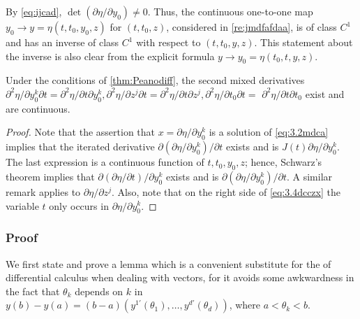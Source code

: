 \documentclass{article}
\begin{document}
\begin{rema}\label{re:sdafa}
By \cref{eq:ijcad},  $\det \left(\partial \eta / \partial y_{0}\right) \neq 0$. Thus, the continuous one-to-one map $y_{0} \rightarrow y=\eta\left(t, t_{0}, y_{0}, z\right)$ for  $\left(t, t_{0}, z\right)$, considered in \cref{re:jmdfafdaa}, is of class $C^{1}$ and has an inverse of class $C^{1}$ with respect to $\left(t, t_{0}, y, z\right)$. This statement about the inverse is also clear from the explicit formula $y \rightarrow y_{0}=\eta\left(t_{0}, t, y, z\right)$.
\end{rema} 

 

\begin{cora}\label{cor:dafe}
 Under the conditions of \cref{thm:Peanodiff}, the second mixed derivatives $\partial^{2} \eta / \partial y_{0}^{k} \partial t=\partial^{2} \eta / \partial t \partial y_{0}^{k}, \partial^{2} \eta / \partial z^{j} \partial t=\partial^{2} \eta / \partial t \partial z^{j}, \partial^{2} \eta / \partial t_{0} \partial t=$ $\partial^{2} \eta / \partial t \partial t_{0}$ exist and are continuous.
\end{cora}
\begin{proof}
Note that the assertion that $x=\partial \eta / \partial y_{0}^{k}$ is a solution of \cref{eq:3.2mdca} implies that the iterated derivative $\partial\left(\partial \eta / \partial y_{0}^{k}\right) / \partial t$ exists and is $J(t) \partial \eta / \partial y_{0}^{k}$. The
last expression is a continuous function of $t, t_{0}, y_{0}, z$; hence, Schwarz's theorem implies that $\partial(\partial \eta / \partial t) / \partial y_{0}^{k}$ exists and is $\partial\left(\partial \eta / \partial y_{0}^{k}\right) / \partial t$. A similar remark applies to $\partial \eta / \partial z^{j}$. Also, note that on the right side of \cref{eq:3.4dcczx} the variable $t$ only occurs in $\partial \eta / \partial y_{0}^{k}$.

\end{proof}
\subsubsection{Proof}\label{sec:proofthm3.1}%
We first state and prove a lemma which is a convenient substitute for the  of differential calculus when dealing with vectors, for it avoids some awkwardness in the fact that $\theta_{k}$ depends on $k$ in $y(b)-y(a)=(b-a)\left(y^{1\prime}\left(\theta_{1}\right), \ldots, y^{d{\prime}}\left(\theta_{d}\right)\right)$, where $a<\theta_{k}<b .$
\end{document}
